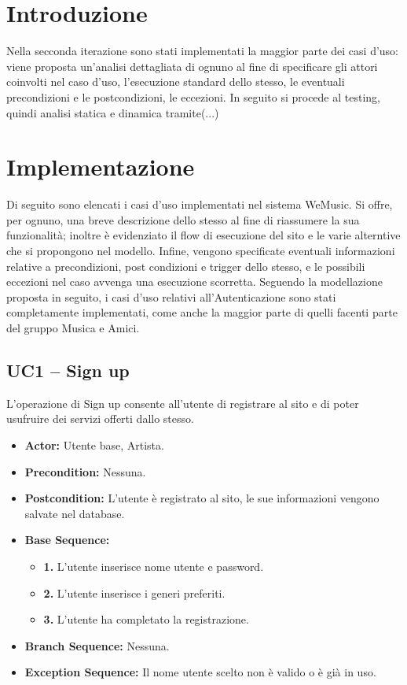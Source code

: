 \section{Introduzione}
Nella secconda iterazione sono stati implementati la maggior parte dei casi d'uso: viene proposta 
un'analisi dettagliata di ognuno al fine di specificare gli attori coinvolti nel caso d'uso, l'esecuzione
standard dello stesso, le eventuali precondizioni e le postcondizioni, le eccezioni.
In seguito si procede al testing, quindi analisi statica e dinamica tramite(...)


\newpage
\section{Implementazione}
Di seguito sono elencati i casi d'uso implementati nel sistema WeMusic. Si offre, per ognuno, una breve descrizione dello stesso 
al fine di riassumere la sua funzionalità; inoltre è evidenziato il flow di esecuzione del sito e le varie alterntive che si propongono nel modello.
Infine, vengono specificate eventuali informazioni relative a precondizioni, post condizioni e trigger dello stesso, e le possibili eccezioni nel 
caso avvenga una esecuzione scorretta. 
Seguendo la modellazione proposta in seguito, i casi d'uso relativi all'Autenticazione sono stati completamente implementati, come anche 
la maggior parte di quelli facenti parte del gruppo Musica e Amici. 

\vspace{1cm}
\subsection{\textbf{UC1 -- Sign up}}
L'operazione di Sign up consente all'utente di registrare al sito 
e di poter usufruire dei servizi offerti dallo stesso. 
\begin{itemize}
    \item \textbf{Actor:} Utente base, Artista.
    \item \textbf{Precondition:} Nessuna.
    \item \textbf{Postcondition:} L'utente è registrato al sito, le sue informazioni vengono salvate nel database.
    \item \textbf{Base Sequence:} 
        \begin{itemize}
            \item \textbf{1.} L'utente inserisce nome utente e password.
            \item \textbf{2.} L'utente inserisce i generi preferiti.
            \item \textbf{3.} L'utente ha completato la registrazione.
        \end{itemize}
    \item \textbf{Branch Sequence:} Nessuna.
    \item \textbf{Exception Sequence:} Il nome utente scelto non è valido o è già in uso.
    
\end{itemize}

